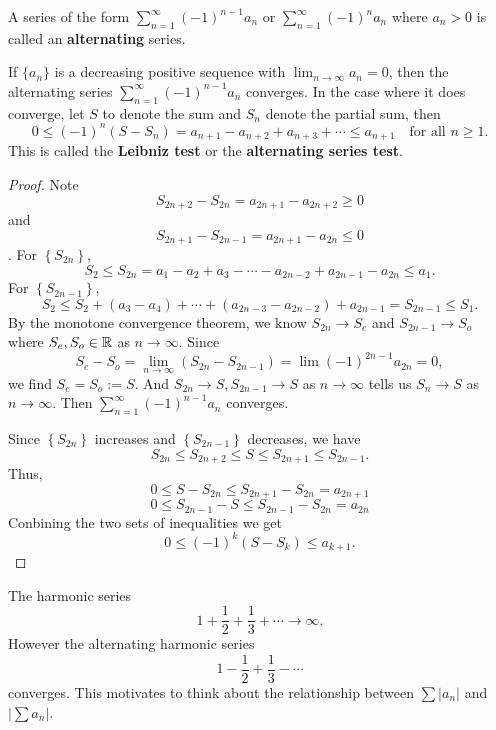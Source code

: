\documentclass[a4paper]{ctexart}
\begin{document}
    \begin{mydef}
        A series of the form $\displaystyle \sum_{n=1}^\infty (-1)^{n-1} a_n$ or $\displaystyle \sum_{n=1}^\infty (-1)^{n} a_n$ where $a_n > 0$ is called an \textbf{alternating} series.
    \end{mydef}
    \begin{mythm}
        If $\{a_n\}$ is a decreasing positive sequence with $\displaystyle \lim_{n\to \infty} a_n = 0$, then the alternating series $\displaystyle \sum_{n=1}^\infty (-1)^{n-1} a_n$ converges. In the case where it does converge, let $S$ to denote the sum and $S_n$ denote the partial sum, then
        \[
        0 \le (-1)^n (S-S_n) = a_{n+1} - a_{n+2} + a_{n+3} + \cdots \le a_{n+1} \quad \text{for all } n\ge 1.
        \] 
        This is called the \textbf{Leibniz test} or the \textbf{alternating series test}.
    \end{mythm}
    \begin{proof}
        Note $$S_{2n+2} - S_{2n} = a_{2n+1} - a_{2n+2} \ge 0$$
        and $$ S_{2n+1} - S_{2n-1} = a_{2n+1} - a_{2n} \le 0$$.
        For $\left\{ S_{2n} \right\}$,
        \[
        S_2 \le S_{2n} = a_1 - a_2 + a_3 - \cdots - a_{2n-2} + a_{2n-1} - a_{2n} \le a_1.
        \]
        For $\left\{ S_{2n-1} \right\}$,
        \[
        S_2 \le S_2 + (a_3 - a_4) + \cdots+ (a_{2n-3} - a_{2n-2}) + a_{2n-1} = S_{2n-1} \le S_1.
        \]
        By the monotone convergence theorem, we know $S_{2n} \to S_e$ and $S_{2n-1} \to S_o$ where $S_e, S_o\in \mathbb{R}$ as $n\to \infty$. Since
        \[
        S_e -  S_o = \lim_{n\to \infty} (S_{2n} - S_{2n-1}) = \lim (-1)^{2n-1} a_{2n} = 0,
        \]
        we find $S_e = S_o := S$. And $S_{2n} \to S, S_{2n-1} \to S$ as $n\to \infty$ tells us $S_n\to S$ as $n\to \infty$. Then $\displaystyle \sum_{n=1}^\infty (-1)^{n-1} a_n$ converges.

        Since $\left\{ S_{2n} \right\}$ increases and $\left\{ S_{2n-1} \right\}$ decreases, we have
        \[
        S_{2n} \le S_{2n+2} \le S \le S_{2n+1} \le S_{2n-1}.
        \]
        Thus,
        \[
        0 \le S-S_{2n} \le S_{2n+1} -S_{2n} = a_{2n+1}
        \]
        \[
        0 \le S_{2n-1} - S \le S_{2n-1} - S_{2n} = a_{2n}
        \]
        Conbining the two sets of inequalities we get
        $$ 0 \le (-1)^k (S-S_k) \le a_{k+1}.$$
    \end{proof}
    \begin{myex}
        The harmonic series
        $$ 1+\frac12 +\frac13 + \cdots \to \infty.$$
        However the alternating harmonic series
        $$ 1-\frac12+\frac13-\cdots $$ converges. This motivates to think about the relationship between $\sum |a_n|$ and $\big|\sum a_n\big|$.
    \end{myex}
\end{document}
